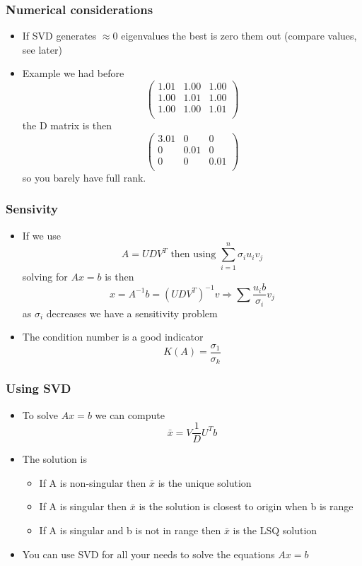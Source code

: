 \documentclass[10pt]{beamer}
\begin{document}
\begin{frame}
  \frametitle{Numerical considerations}
  \begin{itemize}
  \item If SVD generates $\approx 0$ eigenvalues the best is zero them
    out (compare values, see later)
  \item Example we had before
    \[
      \left(
        \begin{array}{ccc}
          1.01 & 1.00 & 1.00 \\
          1.00 & 1.01 & 1.00 \\
          1.00 & 1.00 & 1.01 \\ 
        \end{array}\right)
    \]
    the D matrix is then
    \[
      \left(
        \begin{array}{ccc}
          3.01& 0 & 0 \\
          0& 0.01 & 0 \\
          0 & 0 & 0.01\\ 
        \end{array}\right) 
    \]
    so you barely have full rank. 
  \end{itemize}
\end{frame}

\begin{frame}
  \frametitle{Sensivity}
  \begin{itemize}
  \item If we use
    \[
      A = U D V^T \mbox{ then using } \sum_{i=1}^n \sigma_i u_i v_j
    \]
    solving for $A x = b$ is then
    \[
      x = A^{-1} b = (UDV^T)^{-1} v \Rightarrow \sum \frac{u_i b}{\sigma_i}v_j
    \]
    as $\sigma_i$ decreases we have a sensitivity problem
  \item The condition number is a good indicator
    \[
      K(A) = \frac{\sigma_1}{\sigma_k}
    \]
  \end{itemize}
\end{frame}

\begin{frame}
  \frametitle{Using SVD}
  \begin{itemize}
  \item To solve $A x = b$ we can compute
    \[
      \bar{x} = V \frac{1}{D} U^T b
    \]
  \item The solution is
    \begin{itemize}
    \item If A is non-singular then $\bar{x}$ is the unique solution
    \item If A is singular then $\bar{x}$ is the solution is closest to origin when b is range
    \item If A is singular and b is not in range then $\bar{x}$ is the LSQ solution
    \end{itemize}
  \item You can use SVD for all your needs to solve the equations $A x = b$
  \end{itemize}
\end{frame}
\end{document}
